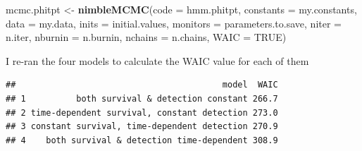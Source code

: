 \documentclass[
  12pt,
]{krantz}
\newenvironment{Shaded}{\begin{snugshade}}{\end{snugshade}}
\newcommand{\AttributeTok}[1]{\textcolor[rgb]{0.13,0.29,0.53}{#1}}
\newcommand{\ConstantTok}[1]{\textcolor[rgb]{0.56,0.35,0.01}{#1}}
\newcommand{\FunctionTok}[1]{\textcolor[rgb]{0.13,0.29,0.53}{\textbf{#1}}}
\newcommand{\NormalTok}[1]{#1}
\newcommand{\OtherTok}[1]{\textcolor[rgb]{0.56,0.35,0.01}{#1}}
\newcommand{\SpecialCharTok}[1]{\textcolor[rgb]{0.81,0.36,0.00}{\textbf{#1}}}
\newcommand{\StringTok}[1]{\textcolor[rgb]{0.31,0.60,0.02}{#1}}
\begin{document}
\begin{Shaded}
\begin{Highlighting}[]
\NormalTok{mcmc.phitpt }\OtherTok{\textless{}{-}} \FunctionTok{nimbleMCMC}\NormalTok{(}\AttributeTok{code =}\NormalTok{ hmm.phitpt,}
                          \AttributeTok{constants =}\NormalTok{ my.constants,}
                          \AttributeTok{data =}\NormalTok{ my.data,}
                          \AttributeTok{inits =}\NormalTok{ initial.values,}
                          \AttributeTok{monitors =}\NormalTok{ parameters.to.save,}
                          \AttributeTok{niter =}\NormalTok{ n.iter,}
                          \AttributeTok{nburnin =}\NormalTok{ n.burnin,}
                          \AttributeTok{nchains =}\NormalTok{ n.chains,}
                          \AttributeTok{WAIC =} \ConstantTok{TRUE}\NormalTok{) }
\end{Highlighting}
\end{Shaded}

I re-ran the four models to calculate the WAIC value for each of them

\begin{Shaded}
\end{Shaded}

\begin{verbatim}
##                                         model  WAIC
## 1          both survival & detection constant 266.7
## 2 time-dependent survival, constant detection 273.0
## 3 constant survival, time-dependent detection 270.9
## 4    both survival & detection time-dependent 308.9
\end{verbatim}
\end{document}
